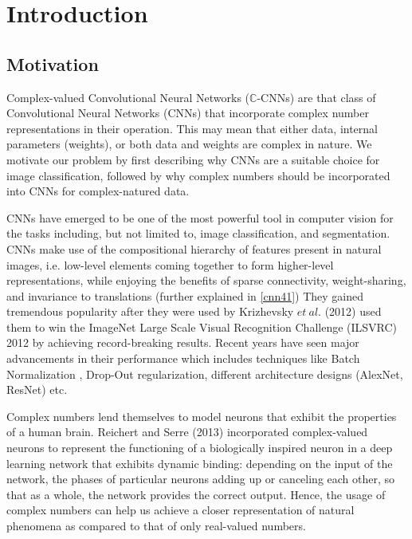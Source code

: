 \chapter{Introduction} \label{chap:intro}

\section{Motivation} \label{sect:moti}

Complex-valued Convolutional Neural Networks ($\mathbb{C}$-CNNs) are that class of Convolutional Neural Networks (CNNs) that incorporate complex number representations in their operation. This may mean that either data, internal parameters (weights), or both data and weights are complex in nature. We motivate our problem by first describing why CNNs are a suitable choice for image classification, followed by why complex numbers should be incorporated into CNNs for complex-natured data.

CNNs have emerged to be one of the most powerful tool in computer vision for the tasks including, but not limited to, image classification, and segmentation. CNNs make use of the compositional hierarchy of features present in natural images, i.e. low-level elements coming together to form higher-level representations, while enjoying the benefits of sparse connectivity, weight-sharing, and invariance to translations (further explained in \ref{cnn41})  They gained tremendous popularity after they were used by Krizhevsky $et \ al.$ (2012) \cite{krizhevsky2012imagenet} used them to win the ImageNet Large Scale Visual Recognition Challenge (ILSVRC) 2012 by achieving record-breaking results. Recent years have seen major advancements in their performance which includes techniques like Batch Normalization \cite{bnIoffeS15}, Drop-Out regularization, different architecture designs (AlexNet, ResNet) etc.

Complex numbers lend themselves to model neurons that exhibit the properties of a human brain. Reichert and Serre (2013) \cite{reichert2013neuronal} incorporated complex-valued neurons to represent the functioning of a biologically inspired neuron in a deep learning network that exhibits dynamic binding: depending on the input of the network, the phases of particular neurons adding up or canceling each other, so that as a whole, the network provides the correct output. Hence, the usage of complex numbers can help us achieve a closer representation of natural phenomena as compared to that of only real-valued numbers.

